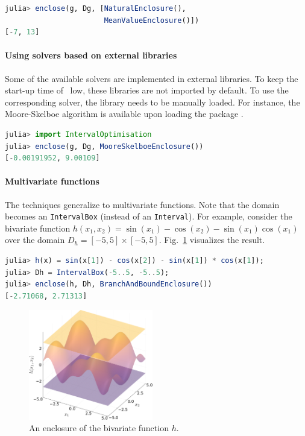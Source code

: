 \documentclass{juliacon}
\begin{document}
\begin{lstlisting}[language=Julia]
julia> enclose(g, Dg, [NaturalEnclosure(),
                       MeanValueEnclosure()])
[-7, 13]
\end{lstlisting}


\paragraph*{Using solvers based on external libraries}

Some of the available solvers are implemented in external libraries. To keep the start-up time of \emph{\RE}\ low, these libraries are not imported by default. To use the corresponding solver, the library needs to be manually loaded. For instance, the Moore-Skelboe algorithm is available upon loading the package .

\begin{lstlisting}[language=Julia]
julia> import IntervalOptimisation
julia> enclose(g, Dg, MooreSkelboeEnclosure())
[-0.00191952, 9.00109]
\end{lstlisting}


\paragraph*{Multivariate functions}

The techniques generalize to multivariate functions. Note that the domain becomes an \texttt{IntervalBox} (instead of an \texttt{Interval}). For example, consider the bivariate function $h(x_1, x_2) = \sin(x_1) - \cos(x_2) - \sin(x_1)\cos(x_1)$ over the domain $D_h = [-5, 5] \times [-5, 5]$. Fig.~\ref{fig:enclosure_3D} visualizes the result.

\begin{lstlisting}[language=Julia]
julia> h(x) = sin(x[1]) - cos(x[2]) - sin(x[1]) * cos(x[1]);
julia> Dh = IntervalBox(-5..5, -5..5);
julia> enclose(h, Dh, BranchAndBoundEnclosure())
[-2.71068, 2.71313]
\end{lstlisting}

\begin{figure}[t]
    \centering
    \includegraphics[width=\linewidth,height=48mm,keepaspectratio]{pic/enclosure_3D}
    \caption{An enclosure of the bivariate function $h$.}
    \label{fig:enclosure_3D}
\end{figure}
\end{document}
